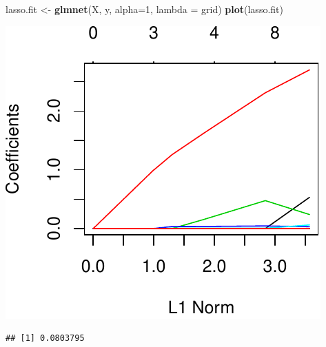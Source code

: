 \documentclass[]{article}
\newenvironment{Shaded}{\begin{snugshade}}{\end{snugshade}}
\newcommand{\DataTypeTok}[1]{\textcolor[rgb]{0.13,0.29,0.53}{#1}}
\newcommand{\DecValTok}[1]{\textcolor[rgb]{0.00,0.00,0.81}{#1}}
\newcommand{\KeywordTok}[1]{\textcolor[rgb]{0.13,0.29,0.53}{\textbf{#1}}}
\newcommand{\NormalTok}[1]{#1}
\newcommand{\OperatorTok}[1]{\textcolor[rgb]{0.81,0.36,0.00}{\textbf{#1}}}
\newcommand{\StringTok}[1]{\textcolor[rgb]{0.31,0.60,0.02}{#1}}
\begin{document}
\begin{Shaded}
\begin{Highlighting}[]
\NormalTok{lasso.fit <-}\StringTok{ }\KeywordTok{glmnet}\NormalTok{(X, y, }\DataTypeTok{alpha=}\DecValTok{1}\NormalTok{, }\DataTypeTok{lambda =}\NormalTok{ grid) }
\KeywordTok{plot}\NormalTok{(lasso.fit)}
\end{Highlighting}
\end{Shaded}

\begin{center}\includegraphics{sol_A4_files/figure-latex/unnamed-chunk-17-1} \end{center}

\begin{Shaded}
\end{Shaded}

\begin{verbatim}
## [1] 0.0803795
\end{verbatim}

\begin{Shaded}
\end{Shaded}
\end{document}
